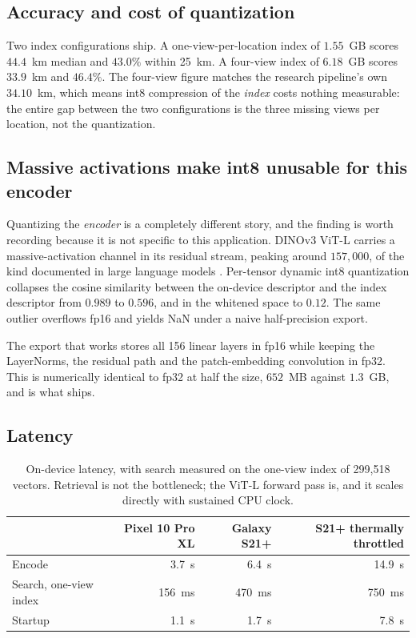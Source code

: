 \documentclass[11pt,a4paper]{article}
\begin{document}
\subsection{Accuracy and cost of quantization}

Two index configurations ship. A one-view-per-location index of $1.55$~GB scores $44.4$~km
median and $43.0\%$ within 25~km. A four-view index of $6.18$~GB scores $33.9$~km and
$46.4\%$. The four-view figure matches the research pipeline's own $34.10$~km, which means
int8 compression of the \emph{index} costs nothing measurable: the entire gap between the two
configurations is the three missing views per location, not the quantization.

\subsection{Massive activations make int8 unusable for this encoder}

Quantizing the \emph{encoder} is a completely different story, and the finding is worth
recording because it is not specific to this application. DINOv3 ViT-L carries a
massive-activation channel in its residual stream, peaking around $157{,}000$, of the kind
documented in large language models \cite{sun2024massive,dettmers2022llmint8}. Per-tensor
dynamic int8 quantization collapses the cosine similarity between the on-device descriptor
and the index descriptor from $0.989$ to $0.596$, and in the whitened space to $0.12$. The
same outlier overflows fp16 and yields NaN under a naive half-precision export.

The export that works stores all 156 linear layers in fp16 while keeping the LayerNorms, the
residual path and the patch-embedding convolution in fp32. This is numerically identical to
fp32 at half the size, $652$~MB against $1.3$~GB, and is what ships.

\subsection{Latency}

\begin{table}[t]
\centering
\small
\begin{tabular}{lrrr}
\toprule
& Pixel 10 Pro XL & Galaxy S21+ & S21+ thermally throttled \\
\midrule
Encode & 3.7~s & 6.4~s & 14.9~s \\
Search, one-view index & 156~ms & 470~ms & 750~ms \\
Startup & 1.1~s & 1.7~s & 7.8~s \\
\bottomrule
\end{tabular}
\caption{On-device latency, with search measured on the one-view index of 299{,}518
vectors. Retrieval is not the bottleneck; the ViT-L forward pass is, and it
scales directly with sustained CPU clock.}
\label{tab:latency}
\end{table}
\end{document}
